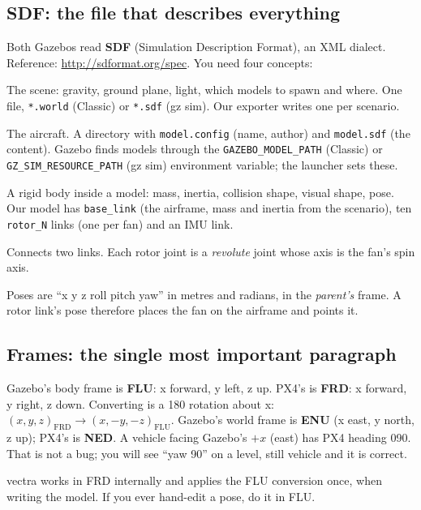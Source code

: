 \documentclass[11pt,a4paper]{article}
\newcommand{\file}[1]{\texttt{#1}}
\begin{document}
\subsection{SDF: the file that describes everything}
Both Gazebos read \textbf{SDF} (Simulation Description Format), an XML dialect. Reference:
\url{http://sdformat.org/spec}. You need four concepts:
\begin{description}[style=nextline]
  \item[world] The scene: gravity, ground plane, light, which models to spawn and where. One file,
        \file{*.world} (Classic) or \file{*.sdf} (gz sim). Our exporter writes one per scenario.
  \item[model] The aircraft. A directory with \file{model.config} (name, author) and
        \file{model.sdf} (the content). Gazebo finds models through the \file{GAZEBO\_MODEL\_PATH}
        (Classic) or \file{GZ\_SIM\_RESOURCE\_PATH} (gz sim) environment variable; the launcher
        sets these.
  \item[link] A rigid body inside a model: mass, inertia, collision shape, visual shape, pose. Our
        model has \file{base\_link} (the airframe, mass and inertia from the scenario), ten
        \file{rotor\_N} links (one per fan) and an IMU link.
  \item[joint] Connects two links. Each rotor joint is a \emph{revolute} joint whose axis is the
        fan's spin axis.
\end{description}

Poses are ``x y z roll pitch yaw'' in metres and radians, in the \emph{parent's} frame. A rotor
link's pose therefore places the fan on the airframe and points it.

\subsection{Frames: the single most important paragraph}
Gazebo's body frame is \textbf{FLU}: x forward, y left, z up. PX4's is \textbf{FRD}: x forward, y
right, z down. Converting is a 180\textdegree{} rotation about x: $(x, y, z)_{\mathrm{FRD}} \to (x, -y,
-z)_{\mathrm{FLU}}$. Gazebo's world frame is \textbf{ENU} (x east, y north, z up); PX4's is
\textbf{NED}. A vehicle facing Gazebo's $+x$ (east) has PX4 heading 090\textdegree. That is not
a bug; you will see ``yaw 90'' on a level, still vehicle and it is correct.

vectra works in FRD internally and applies the FLU conversion once, when writing the model. If
you ever hand-edit a pose, do it in FLU.
\end{document}
